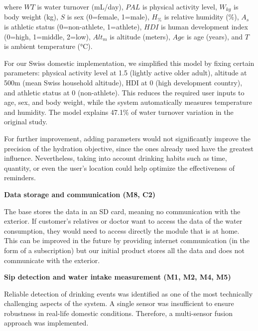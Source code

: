 \documentclass{article}
\begin{document}
where $WT$ is water turnover (mL/day), $PAL$ is physical activity level, $W_{kg}$ is body weight (kg), $S$ is sex (0=female, 1=male), $H_{\%}$ is relative humidity (\%), $A_s$ is athletic status (0=non-athlete, 1=athlete), $HDI$ is human development index (0=high, 1=middle, 2=low), $Alt_m$ is altitude (meters), $Age$ is age (years), and $T$ is ambient temperature (°C).

For our Swiss domestic implementation, we simplified this model by fixing certain parameters: physical activity level at 1.5 (lightly active older adult), altitude at 500m (mean Swiss household altitude), HDI at 0 (high development country), and athletic status at 0 (non-athlete). This reduces the required user inputs to age, sex, and body weight, while the system automatically measures temperature and humidity. The model explains 47.1\% of water turnover variation in the original study.\vspace{0.2cm}

For further improvement, adding parameters would not significantly improve the precision of the hydration objective, since the ones already used have the greatest influence. Nevertheless, taking into account drinking habits such as time, quantity, or even the user's location could help optimize the effectiveness of reminders.\vspace{0.2cm}

\noindent \textbf{Data storage and communication (M8, C2)}\vspace{0.2cm}

The base stores the data in an SD card, meaning no communication with the exterior. If customer's relatives or doctor want to access the data of the water consumption, they would need to access directly the module that is at home. 
This can be improved in the future by providing internet communication (in the form of a subscription) but our initial product stores all the data and does not communicate with the exterior.\vspace{0.2cm}

\noindent \textbf{Sip detection and water intake measurement (M1, M2, M4, M5)}\vspace{0.2cm}

Reliable detection of drinking events was identified as one of the most technically challenging aspects of the system. A single sensor was insufficient to ensure robustness in real-life domestic conditions. Therefore, a multi-sensor fusion approach was implemented.\vspace{0.2cm}
\end{document}
